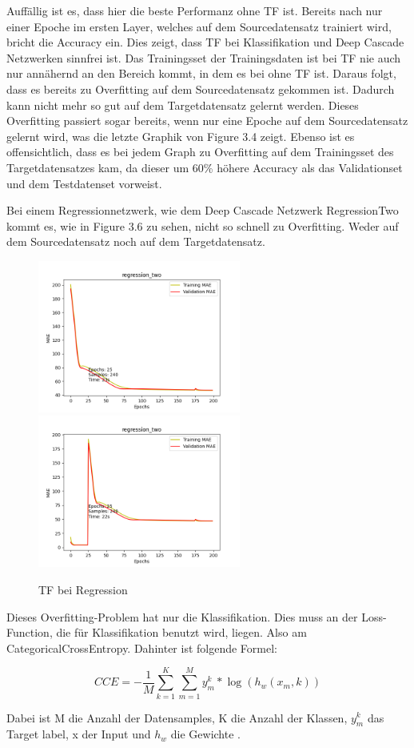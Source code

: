 Auffällig ist es, dass hier die beste Performanz ohne TF ist. Bereits nach nur einer Epoche im ersten Layer, welches auf dem Sourcedatensatz 
trainiert wird, bricht die Accuracy ein. Dies zeigt, dass TF bei Klassifikation und Deep Cascade Netzwerken sinnfrei ist. Das 
Trainingsset der Trainingsdaten ist bei TF nie auch nur annähernd an den Bereich kommt, in dem es bei ohne TF ist. Daraus folgt, dass es 
bereits zu Overfitting auf dem Sourcedatensatz gekommen ist. Dadurch kann nicht mehr so gut auf dem Targetdatensatz gelernt werden. Dieses 
Overfitting passiert sogar bereits, wenn nur eine Epoche auf dem Sourcedatensatz gelernt wird, was die letzte Graphik von Figure 3.4 zeigt. 
Ebenso ist es offensichtlich, dass es bei jedem Graph zu Overfitting auf dem Trainingsset des Targetdatensatzes kam, da dieser um 60\% höhere 
Accuracy als das Validationset und dem Testdatenset vorweist. 

Bei einem Regressionnetzwerk, wie dem Deep Cascade Netzwerk RegressionTwo kommt es, wie in Figure 3.6 zu sehen, nicht so schnell zu Overfitting. 
Weder auf dem Sourcedatensatz noch auf dem Targetdatensatz. 

\begin{figure}[htpb]
    \includegraphics[height=5cm]{../../Plots/ba_plots/regr2/woregr2tr.png}
    \includegraphics[height=5cm]{../../Plots/ba_plots/regr2/1TFtr.png}
    \caption{\label{fig:regr2tf} TF bei Regression}
\end{figure}

Dieses Overfitting-Problem hat nur die Klassifikation. Dies muss an der Loss-Function, die für Klassifikation benutzt wird, liegen. Also 
am CategoricalCrossEntropy. Dahinter ist folgende Formel: 

\begin{equation}
    CCE = -\frac{1}{M} \sum_{k=1}^{K}\sum_{m=1}^{M} y_m^k * \log(h_w(x_m, k))
\end{equation} 

Dabei ist M die Anzahl der Datensamples, K die Anzahl der Klassen, $y_m^k$ das Target label, x der Input und $h_w$ die 
Gewichte \cite{rwcrossentropy}. 
